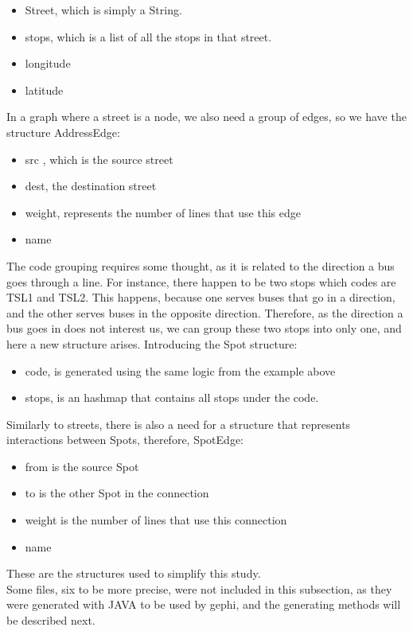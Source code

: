 \documentclass[12pt]{report}
\begin{document}
	\begin{itemize}
		\item Street, which is simply a String.
		\item stops, which is a list of all the stops in that street.
		\item longitude
		\item latitude
	\end{itemize}
	
	In a graph where a street is a node, we also need a group of edges, so we have the structure AddressEdge: 
	\begin{itemize}
		\item src , which is the source street
		\item dest, the destination street
		\item weight, represents the number of lines that use this edge
		\item name
	\end{itemize}
	
	The code grouping requires some thought, as it is related to the direction a bus goes through a line. For instance, there happen to be two stops which codes are TSL1 and TSL2. This happens, because one serves buses that go in a direction, and the other serves buses in the opposite direction. Therefore, as the direction a bus goes in does not interest us, we can group these two stops into only one, and here a new structure arises. Introducing the Spot structure:
	
	\begin{itemize}
		\item code, is generated using the same logic from the example above
		\item stops, is an hashmap that contains all stops under the code.
	\end{itemize}
	
	Similarly to streets, there is also a need for a structure that represents interactions between Spots, therefore, SpotEdge:
	
		\begin{itemize}
			\item from is the source Spot
			\item to is the other Spot in the connection
			\item weight is the number of lines that use this connection
			\item name
		\end{itemize}
	
	These are the structures used to simplify this study.\\
	Some files, six to be more precise, were not included in this subsection, as they were generated with JAVA to be used by gephi, and the generating methods will be described next.
\end{document}
